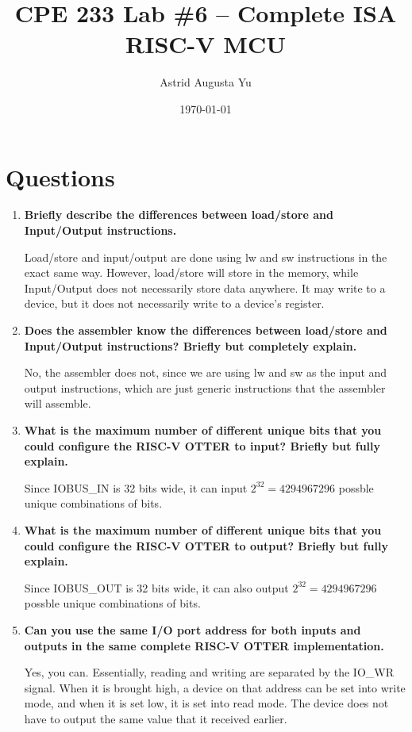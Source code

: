 \documentclass{article}
\author{Astrid Augusta Yu}
\title{CPE 233 Lab \#6 -- Complete ISA RISC-V MCU}
\date{\today}
\begin{document}
\maketitle

\tableofcontents

\section{Questions}

\begin{enumerate}
    \item \textbf{Briefly describe the differences between load/store and Input/Output instructions.}

    Load/store and input/output are done using lw and sw instructions in the exact same way. However, 
    load/store will store in the memory, while Input/Output does not necessarily store data anywhere.
    It may write to a device, but it does not necessarily write to a device's register.
    
    \item \textbf{Does the assembler know the differences between load/store and Input/Output instructions?
    Briefly but completely explain.}

    No, the assembler does not, since we are using lw and sw as the input and output instructions, which are 
    just generic instructions that the assembler will assemble.
    
    \item \textbf{What is the maximum number of different unique bits that you could configure the RISC-V
    OTTER to input? Briefly but fully explain.}

    Since IOBUS\_IN is 32 bits wide, it can input $2^{32} = 4294967296$ possble unique combinations 
    of bits.

    \item \textbf{What is the maximum number of different unique bits that you could configure the RISC-V
    OTTER to output? Briefly but fully explain.}

    Since IOBUS\_OUT is 32 bits wide, it can also output $2^{32} = 4294967296$ possble unique combinations 
    of bits.

    \item \textbf{Can you use the same I/O port address for both inputs and outputs in the same complete RISC-V
    OTTER implementation.}

    Yes, you can. Essentially, reading and writing are separated by the IO\_WR signal. When it is brought high,
    a device on that address can be set into write mode, and when it is set low, it is set into read mode. 
    The device does not have to output the same value that it received earlier. 


\end{enumerate}
\end{document}
